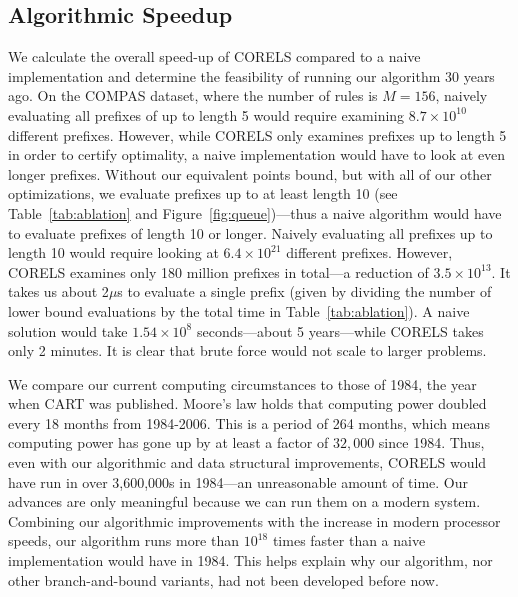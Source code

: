 \subsection{Algorithmic Speedup}
We calculate the overall speed-up of CORELS compared to a naive implementation and determine the feasibility of running
our algorithm 30 years ago.
%
On the COMPAS dataset, where the number of rules is $M = 156$, naively evaluating all prefixes of up to length 5 would
require examining $8.7 \times 10^{10}$ different prefixes.
%
However, while CORELS only examines prefixes up to length 5 in order to certify optimality, a naive implementation 
would have to look at even longer prefixes. 
%
Without our equivalent points bound, but with all of our other optimizations, we evaluate prefixes up to at least length 10 (see 
Table~\ref{tab:ablation} and Figure~\ref{fig:queue})---thus a naive algorithm would have to evaluate prefixes of length 10 or longer.
%
Naively evaluating all prefixes up to length 10 would require looking at $6.4 \times 10^{21}$ different prefixes.
%
However, CORELS examines only 180 million prefixes in total---a reduction of $3.5 \times 10^{13}$.
%
It takes us about 2$\mu$s to evaluate a single prefix (given by dividing the number of lower bound evaluations by the total time
in Table~\ref{tab:ablation}).
%
A naive solution would take $1.54 \times 10^8$ seconds---about 5 years---while CORELS takes only 2 minutes.
%
It is clear that brute force would not scale to larger problems.
%

We compare our current computing circumstances to those of 1984, the year when CART was published.
%
Moore's law holds that computing power doubled every 18 months from 1984-2006.
%
This is a period of 264 months, which means computing power has gone up by at least a factor of $32,000$ since 1984.
%
Thus, even with our algorithmic and data structural improvements, CORELS would have run in over 3,600,000s in 1984---an unreasonable amount of time.
%
Our advances are only meaningful because we can run them on a modern system.
%
Combining our algorithmic improvements with the increase in modern processor speeds, our algorithm runs more than $10^{18}$ times faster than a naive implementation would have in 1984.
%
This helps explain why our algorithm, nor other branch-and-bound variants, had not been developed before now.